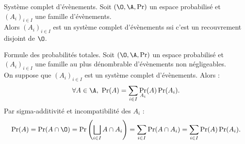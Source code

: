 \documentclass[11pt]{article}
\begin{document}
\vspace*{-0.8cm}

\begin{defi}{Système complet d'évènements.}{}
    Soit $(\O,\A,\Pr)$ un espace probabilisé et $(A_i)_{i\in I}$ une famille d'évènements.\\
    Alors $(A_i)_{i\in I}$ est un système complet d'évènements ssi c'est un recouvrement disjoint de $\O$.
\end{defi}

\vspace*{-0.8cm}

\begin{prop}{Formule des probabilités totales.}{}
    Soit $(\O,\A,\Pr)$ un espace probabilisé et $(A_i)_{i\in I}$ une famille au plus dénombrable d'évènements non négligeables.\\
    On suppose que $(A_i)_{i\in I}$ est un système complet d'évènements. Alors :
    \begin{equation*}
        \forall A \in \A, ~ \Pr(A) = \sum_{i\in I}\Pr_{A_i}(A)\Pr(A_i).
    \end{equation*}
    \tcblower
    Par sigma-additivité et incompatibilité des $A_i$ :
    \begin{equation*}
        \Pr(A) = \Pr(A\cap \O) = \Pr\left(\bigsqcup_{i\in I} A\cap A_i \right) = \sum_{i\in I}\Pr(A\cap A_i) = \sum_{i\in I}\Pr(A)\Pr(A_i).
    \end{equation*}
\end{prop}

\vspace*{-0.8cm}
\end{document}
